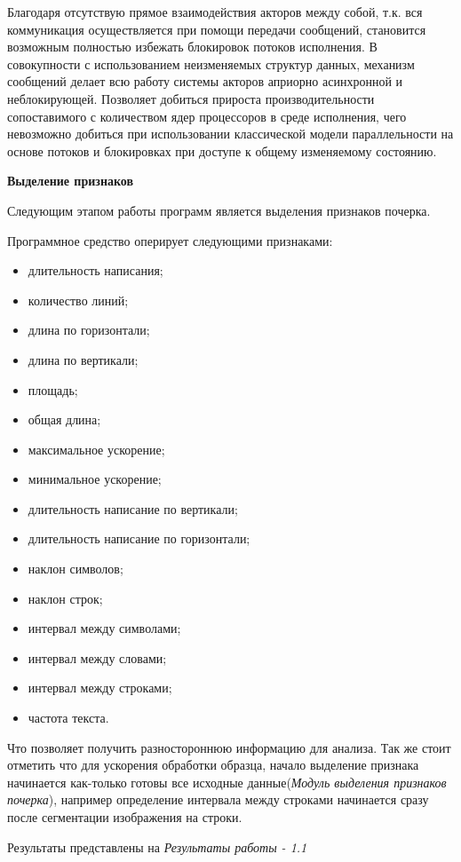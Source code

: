 Благодаря отсутствую прямое взаимодействия акторов между собой, т.к. вся коммуникация осуществляется при помощи передачи сообщений, становится возможным полностью избежать блокировок потоков исполнения. В совокупности с использованием неизменяемых структур данных, механизм сообщений делает всю работу системы акторов априорно асинхронной и неблокирующей. Позволяет добиться прироста производительности сопоставимого с количеством ядер процессоров в среде исполнения, чего невозможно добиться при использовании классической модели параллельности на основе потоков и блокировках при доступе к общему изменяемому состоянию.

\textbf{Выделение признаков}
\bigskip

Следующим этапом работы программ является выделения признаков почерка.

Программное средство оперирует следующими признаками:
\begin{itemize}
  \item длительность написания;  
  \item количество линий;
  \item длина по горизонтали;
  \item длина по вертикали;
  \item площадь;
  \item общая длина;
  \item максимальное ускорение;
  \item минимальное ускорение;
  \item длительность написание по вертикали;
  \item длительность написание по горизонтали;
  \item наклон символов;
  \item наклон строк;
  \item интервал между символами;
  \item интервал между словами;
  \item интервал между строками;
  \item частота текста.
\end{itemize}

Что позволяет получить разностороннюю информацию для анализа.
Так же стоит отметить что для ускорения обработки образца, начало выделение признака начинается как-только готовы все исходные данные(\emph{Модуль выделения признаков почерка}), например определение интервала между строками начинается сразу после сегментации изображения на строки.

Результаты представлены на \emph{Результаты работы - 1.1}

